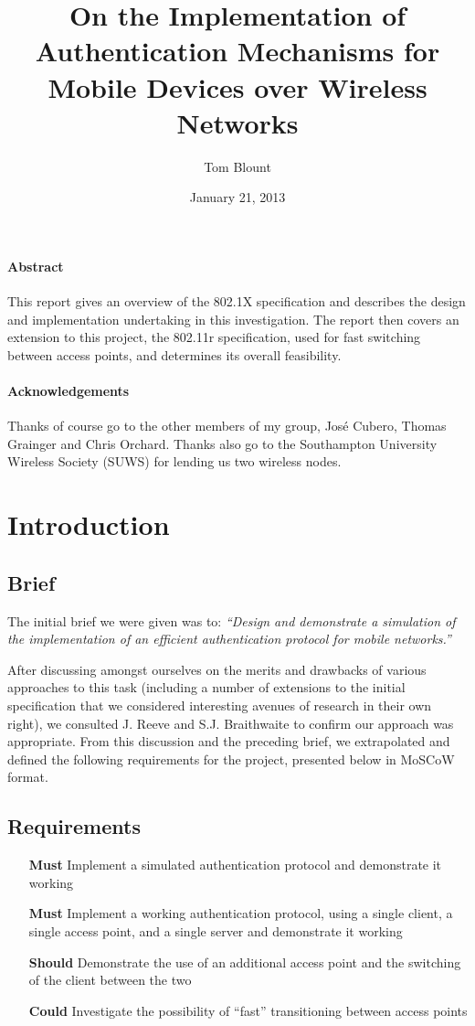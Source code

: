 \documentclass[12pt,a4paper,titlepage]{article}
\author{Tom Blount}
\date{January 21, 2013}
\title{On the Implementation of Authentication Mechanisms for Mobile Devices over Wireless Networks}
\begin{document}
\maketitle

\tableofcontents
\newpage
\paragraph{Abstract}
This report gives an overview of the 802.1X specification and describes the design and implementation undertaking in this investigation. The report then covers an extension to this project, the 802.11r specification, used for fast switching between access points, and determines its overall feasibility.

\paragraph{Acknowledgements}
Thanks of course go to the other members of my group, José Cubero, Thomas Grainger and Chris Orchard.
Thanks also go to the Southampton University Wireless Society (SUWS) for lending us two wireless nodes.

\newpage
\section{Introduction}

\subsection{Brief}
The initial brief we were given was to: 
\textit{{\quote ``Design and demonstrate a simulation of the implementation of an efficient authentication protocol for mobile networks.''}}

After discussing amongst ourselves on the merits and drawbacks of various approaches to this task (including a number of extensions to the initial specification that we considered interesting avenues of research in their own right), we consulted J. Reeve and S.J. Braithwaite to confirm our approach was appropriate. From this discussion and the preceding brief, we extrapolated and defined the following requirements for the project, presented below in MoSCoW format.

\subsection{Requirements}
\begin{itemize}
\item[\textbf{Must}] Implement a simulated authentication protocol and demonstrate it working
\item[\textbf{Must}] Implement a working authentication protocol, using a single client, a single access point, and a single server and demonstrate it working
\item[\textbf{Should}] Demonstrate the use of an additional access point and the switching of the client between the two
\item[\textbf{Could}] Investigate the possibility of ``fast'' transitioning between access points
\end{itemize}
\end{document}
